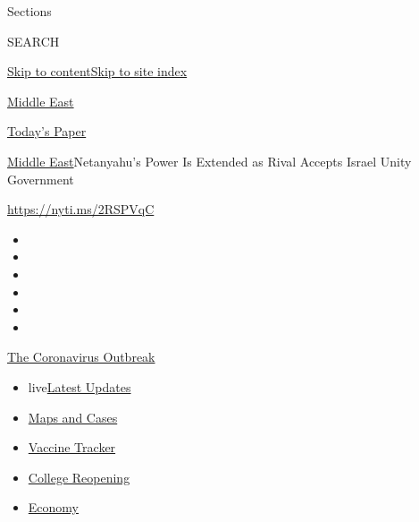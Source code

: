Sections

SEARCH

\protect\hyperlink{site-content}{Skip to
content}\protect\hyperlink{site-index}{Skip to site index}

\href{https://www.nytimes3xbfgragh.onion/section/world/middleeast}{Middle
East}

\href{https://myaccount.nytimes3xbfgragh.onion/auth/login?response_type=cookie\&client_id=vi}{}

\href{https://www.nytimes3xbfgragh.onion/section/todayspaper}{Today's
Paper}

\href{/section/world/middleeast}{Middle East}\textbar{}Netanyahu's Power
Is Extended as Rival Accepts Israel Unity Government

\url{https://nyti.ms/2RSPVqC}

\begin{itemize}
\item
\item
\item
\item
\item
\item
\end{itemize}

\href{https://www.nytimes3xbfgragh.onion/news-event/coronavirus?action=click\&pgtype=Article\&state=default\&region=TOP_BANNER\&context=storylines_menu}{The
Coronavirus Outbreak}

\begin{itemize}
\tightlist
\item
  live\href{https://www.nytimes3xbfgragh.onion/2020/08/04/world/coronavirus-covid-19.html?action=click\&pgtype=Article\&state=default\&region=TOP_BANNER\&context=storylines_menu}{Latest
  Updates}
\item
  \href{https://www.nytimes3xbfgragh.onion/interactive/2020/us/coronavirus-us-cases.html?action=click\&pgtype=Article\&state=default\&region=TOP_BANNER\&context=storylines_menu}{Maps
  and Cases}
\item
  \href{https://www.nytimes3xbfgragh.onion/interactive/2020/science/coronavirus-vaccine-tracker.html?action=click\&pgtype=Article\&state=default\&region=TOP_BANNER\&context=storylines_menu}{Vaccine
  Tracker}
\item
  \href{https://www.nytimes3xbfgragh.onion/2020/08/02/us/covid-college-reopening.html?action=click\&pgtype=Article\&state=default\&region=TOP_BANNER\&context=storylines_menu}{College
  Reopening}
\item
  \href{https://www.nytimes3xbfgragh.onion/live/2020/08/03/business/stock-market-today-coronavirus?action=click\&pgtype=Article\&state=default\&region=TOP_BANNER\&context=storylines_menu}{Economy}
\end{itemize}

